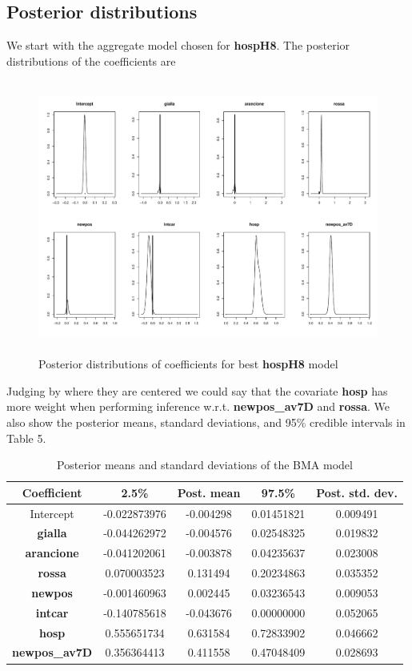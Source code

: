 \documentclass[12pt,a4paper]{article}
\theoremstyle{definition}
\theoremstyle{remark}
\begin{document}
\subsection{Posterior distributions }
We start with the aggregate model chosen for \textbf{hospH8}. The posterior distributions of the coefficients are
\begin{figure}[htb!]
	\centering
	\includegraphics[width=155mm, height=90mm,scale=0.5]{posteriors_1.pdf}
	\caption{Posterior distributions of coefficients for best \textbf{hospH8} model}
\end{figure}

Judging by where they are centered we could say that the covariate \textbf{hosp} has more weight when performing inference w.r.t. \textbf{newpos\_av7D} and \textbf{rossa}.
We also show the posterior means, standard deviations, and 95\% credible intervals in Table 5.
\begin{table}[htb!]
	\centering
	\begin{tabular}{|c|c|c|c|c|}
		\hline
		Coefficient        & 2.5\%  & Post. mean & 97.5\% & Post. std. dev.\\ \hline
		Intercept          &-0.022873976 & -0.004298      & 0.01451821 & 0.009491                  \\ \hline
		\textbf{gialla}   & -0.044262972 & -0.004576 & 0.02548325    & 0.019832                   \\ \hline
		\textbf{arancione}& -0.041202061&-0.003878 &  0.04235637   &  0.023008                     \\ \hline
		\textbf{rossa}    &  0.070003523 &0.131494   &0.20234863    & 0.035352                    \\ \hline
		\textbf{newpos}    & -0.001460963 & 0.002445   &0.03236543      &0.009053                    \\ \hline
		\textbf{intcar}    &-0.140785618& -0.043676   &0.00000000     &  0.052065                   \\ \hline
		\textbf{hosp}   &0.555651734   & 0.631584     &0.72833902  & 0.046662                 \\ \hline
		\textbf{newpos\_av7D}     & 0.356364413 &  0.411558&0.47048409      &  0.028693              \\ \hline
	\end{tabular}
	\caption{Posterior means and standard deviations of the BMA model}
\end{table}
\end{document}
